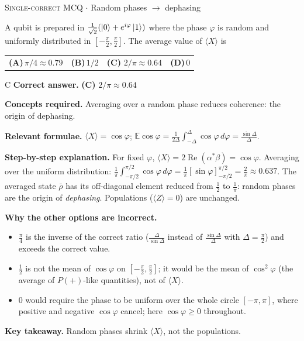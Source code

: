 \documentclass[11pt,a4paper]{article}
\newcommand{\optlabel}[1]{\textbf{(#1)}}
\newcommand{\correctlabel}[1]{\textcolor{okgreen}{\textbf{(#1)}\,\ding{51}}}
\newenvironment{qitem}[1]{\begin{list}{}{\setlength{\leftmargin}{3.3em}\setlength{\labelwidth}{3.1em}%
  \setlength{\labelsep}{0.2em}\setlength{\topsep}{3pt}\setlength{\parsep}{3pt}}\item[\textbf{Q.#1}\hfill]}{\end{list}}
\newcommand{\qsep}{\par\vspace{2pt}{\color{black!15}\hrule}\vspace{4pt}}
\newcommand{\qmeta}[2]{{\footnotesize\color{black!60}\textsc{#1} \;$\cdot$\; #2}\par}
\begin{document}
\begin{qitem}{6}
\qmeta{Single-correct MCQ}{Random phases $\to$ dephasing}
A qubit is prepared in $\frac{1}{\sqrt2}(\ket0 + e^{i\varphi}\ket1)$ where the phase $\varphi$ is random and uniformly distributed in
$[-\frac\pi2, \frac\pi2]$. The average value of $\langle X\rangle$ is
\par\smallskip\noindent\begin{tabularx}{\linewidth}{@{}*{4}{L}@{}}
\optlabel{A}\,$\pi/4 \approx 0.79$ & \optlabel{B}\,$1/2$ & \correctlabel{C}\,$2/\pi \approx 0.64$ & \optlabel{D}\,$0$
\end{tabularx}
\end{qitem}
\begin{solbox}{C}
\textbf{\color{brand}Correct answer.} \textcolor{okgreen}{\textbf{(C)}} $2/\pi \approx 0.64$

\textbf{\color{brand}Concepts required.} Averaging over a random phase reduces coherence: the origin of dephasing.

\textbf{\color{brand}Relevant formulae.} $\langle X\rangle = \cos\varphi$; $\mathbb E\cos\varphi = \frac{1}{2\Delta}\int_{-\Delta}^{\Delta}\cos\varphi\,d\varphi = \frac{\sin\Delta}{\Delta}$.

\textbf{\color{brand}Step-by-step explanation.} For fixed $\varphi$, $\langle X\rangle = 2\operatorname{Re}(\alpha^*\beta) = \cos\varphi$. Averaging over the uniform distribution:
$\frac1\pi\int_{-\pi/2}^{\pi/2}\cos\varphi\,d\varphi = \frac{1}{\pi}[\sin\varphi]_{-\pi/2}^{\pi/2} = \frac2\pi \approx 0.637$.
The averaged state $\bar\rho$ has its off-diagonal element reduced from $\frac12$ to $\frac1\pi$: random phases are the origin of
\emph{dephasing}. Populations ($\langle Z\rangle = 0$) are unchanged.

\textbf{\color{brand}Why the other options are incorrect.}
\begin{itemize}[leftmargin=2.4em, itemsep=1pt, topsep=2pt]
\item[\textbf{(A)}] $\frac\pi4$ is the inverse of the correct ratio ($\frac{\Delta}{\sin\Delta}$ instead of $\frac{\sin\Delta}{\Delta}$ with $\Delta = \frac\pi2$) and exceeds the correct value.
\item[\textbf{(B)}] $\frac12$ is not the mean of $\cos\varphi$ on $[-\frac\pi2, \frac\pi2]$; it would be the mean of $\cos^2\varphi$ (the average of $P(+)$-like quantities), not of $\langle X\rangle$.
\item[\textbf{(D)}] $0$ would require the phase to be uniform over the whole circle $[-\pi, \pi]$, where positive and negative $\cos\varphi$ cancel; here $\cos\varphi \ge 0$ throughout.
\end{itemize}
\textbf{\color{brand}Key takeaway.} Random phases shrink $\langle X\rangle$, not the populations.
\end{solbox}
\qsep
\end{document}
